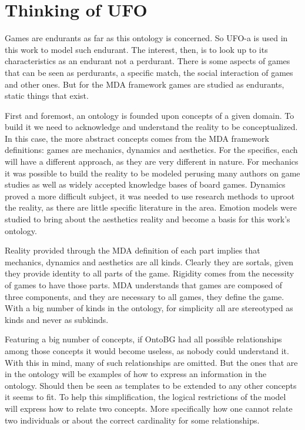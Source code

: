 \section{Thinking of UFO} 


Games are endurants as far as this ontology is concerned. So UFO-a is used in this work to model such endurant. The interest, then, is to look up to its characteristics as an endurant not a perdurant. There is some aspects of games that can be seen as perdurants, a specific match, the social interaction of games and other ones. But for the MDA framework games are studied as endurants, static things that exist.

First and foremost, an ontology is founded upon concepts of a given domain. To build it we need to acknowledge and understand the reality to be conceptualized. In this case, the more abstract concepts comes from the MDA framework definitions: games are mechanics, dynamics and aesthetics. For the specifics, each will have a different approach, as they are very different in nature. For mechanics it was possible to build the reality to be modeled perusing many authors on game studies as well as widely accepted knowledge bases of board games. Dynamics proved a more difficult subject, it was needed to use research methods to uproot the reality, as there are little specific literature in the area. Emotion models were studied to bring about the aesthetics reality and become a basis for this work's ontology.

Reality provided through the MDA definition of each part implies that mechanics, dynamics and aesthetics are all kinds. Clearly they are sortals, given they provide identity to all parts of the game. Rigidity comes from the necessity of games to have those parts. MDA understands that games are composed of three components, and they are necessary to all games, they define the game. With a big number of kinds in the ontology, for simplicity all are stereotyped as kinds and never as subkinds.

Featuring a big number of concepts, if OntoBG had all possible relationships among those concepts it would become useless, as nobody could understand it. With this in mind, many of such relationships are omitted. But the ones that are in the ontology will be examples of how to express an information in the ontology. Should then be seen as templates to be extended to any other concepts it seems to fit. To help this simplification, the logical restrictions of the model will express how to relate two concepts. More specifically how one cannot relate two individuals or about the correct cardinality for some relationships. 

